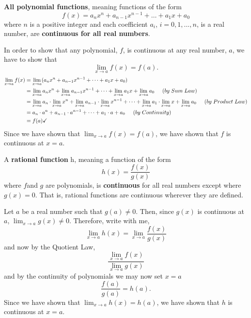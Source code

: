 \documentclass{ximera}
\begin{document}
\begin{theorem}
 \textbf{All polynomial functions}, meaning functions of the form
  \[
  f(x) = a_nx^n + a_{n-1}x^{n-1} + \dots + a_1 x + a_0
  \]
  where $n$ is a positive integer  and each coefficient $a_i$, $i=0, 1,...,n$, is a real number, are
  \textbf{continuous for all real numbers}.
  \begin{explanation}
  In order to show that any polynomial, $f$, is continuous at any real number, $a$, we have to show that
  \[
  \lim_{x\to a} f(x)=f(a).
  \]
  \begin{align*}
    \lim_{x\to a} f(x)&= \lim_{x\to a} (a_nx^n + a_{n-1}x^{n-1} + \dots + a_1 x + a_0 )\\
    &= \lim_{x\to a} a_nx^n + \lim_{x\to a} a_{n-1}x^{n-1} + \dots +  \lim_{x\to a}a_1 x + \lim_{x\to a} a_0\hspace{0.2in}(by \hspace{0.04in}Sum\hspace{0.04in} Law)\\
    &= \lim_{x\to a} a_n\cdot \lim_{x\to a}x^n + \lim_{x\to a} a_{n-1}\cdot \lim_{x\to a}x^{n-1} + \dots +  \lim_{x\to a}a_1 \cdot \lim_{x\to a}x + \lim_{x\to a} a_0 \hspace{0.2in}(by \hspace{0.04in}Product\hspace{0.04in}Law)\\
    &= a_n\cdot a^n +  a_{n-1}\cdot a^{n-1} + \dots + a_1 \cdot a + a_0 \hspace{0.2in}(by \hspace{0.04in}Continuity)\\
    &=f(a)\checkmark
   \end{align*}
   Since we have shown that $\lim_{x\to a} f(x) = f(a)$, we have
      shown that $f$ is continuous at $x=a$.
  \end{explanation}
\end{theorem}

\begin{theorem}
   A \textbf{rational function} h, meaning a function of the form 
  \[
  h(x)=\frac{f(x)}{g(x)}
  \]
  where $f $and $g$ are polynomials, is \textbf{continuous} for all real numbers except where $g(x)=0$.  That is,
  rational functions are continuous wherever they are defined.
\begin{explanation}
      Let $a$ be a real number such that $g(a)\neq 0$.  Then, since
      $g(x)$ is continuous at $a$, $\lim_{x\to a} g(x) \neq 0$.
      Therefore, write with me, 
      \[
      \lim_{x \to a} h(x) = \lim_{x\to a} \frac{f(x)}{g(x)}
      \]
      and now by the Quotient Law, 
      \[
      \frac{\lim_{x\to a} f(x)}{ \lim_{x\to a} g(x)}
      \]
      and by the continuity of polynomials we may now set $x=a$
      \[
      \frac{f(a)}{g(a)}=h(a).
      \]
      Since we have shown that $\lim_{x\to a} h(x) = h(a)$, we have
      shown that $h$ is continuous at $x=a$.
\end{explanation}
\end{theorem}
\end{document}
